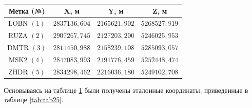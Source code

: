 \begin{table} [htbp]
	\centering\small
	\begin{threeparttable}%
	\label{tab:tab24}{
	\begin{tabular}{|c|c|c|c|}
		\hline
		\textbf{Метка (№)}			& \textbf{X, м}		& \textbf{Y, м}		& \textbf{Z, м}		\\ \hline
		LOBN $(1)$					& $2837136,604$		& $2165621,902$		& $5268527,919$		\\ \hline
		RUZA $(2)$					& $2907267,745$		& $2127203,200$		& $5246025,953$		\\ \hline
		DMTR $(3)$					& $2811450,988$		& $2158239,108$		& $5285093,057$		\\ \hline
		MSK2 $(4)$					& $2847083,993$		& $2191776,459$		& $5252448,474$		\\ \hline
		ZHDR $(5)$					& $2834298,462$		& $2216036,180$		& $5249102,708$		\\ \hline
	\end{tabular}
	}
	\end{threeparttable}
\end{table}

Основываясь на таблице \cref{tab:tab24} были получены эталонные координаты, приведенные в таблице \cref{tab:tab25}.

